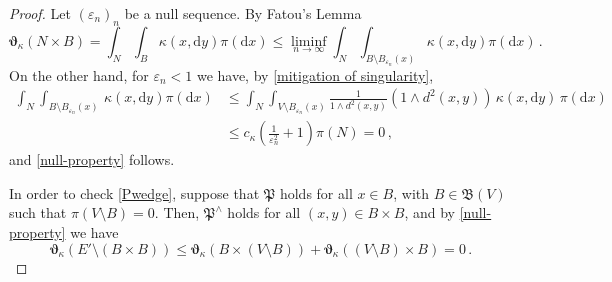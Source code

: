 \documentclass[11pt,reqno]{amsart}
\numberwithin{equation}{section}
\newcommand{\eps}{\varepsilon}
\newcommand{\dd}{\mathrm{d}}
\theoremstyle{definition}
\newcommand{\ep}{\varepsilon}
\let\eps\ep
\def\dd{\mathrm{d}}
\newcommand{\teta}{\boldsymbol \vartheta}
\newcommand{\tetapi}{\boldsymbol{\teta}_{\kappa}}
\newcommand{\Ed}{{E'}}
\newcommand{\down}{\downarrow}
\newcommand{\TODOBS}[1]{\todo[inline, color=red!40]{#1}}
\newcommand{\TODO}[1]{\todo[inline, color=cyan!20]{#1}}
\newcommand{\EEE}{\color{black}}
\numberwithin{equation}{section}
\begin{document}
 \begin{proof}
Let $(\eps_n)_n$ be a null sequence. By Fatou's Lemma 
\[
\tetapi(N{\times}B) = \int_N \int_B \kappa(x,\dd y ) \pi(\dd x ) \leq \liminf_{n\to\infty} \int_{N} \int_{B{\setminus}B_{\eps_n}(x)} \kappa(x,\dd y )  \pi (\dd x )\,.
\]
On the other hand, for $\eps_n<1$ we have, by  \eqref{mitigation of singularity}, 
\[
\begin{aligned}
\int_{N} \int_{B{\setminus}B_{\eps_n}(x)}\, \kappa(x,\dd y )  \pi (\dd x )  & \leq \int_{N} \int_{V{\setminus}B_{\eps_n}(x)} \frac1{1{\wedge}  d^2(x,y)}
  (1{\wedge} d^2(x,y)) \,\kappa(x,\dd y)\,   \pi (\dd x ) 
 \\ &  \leq c_\kappa \left(\frac1{\eps_n^2} {+} 1\right) \pi (N) =0\,,
 \end{aligned}
\]
and \eqref{null-property} follows. 
\par
In order to check \eqref{Pwedge}, suppose that $\mathfrak{P}$ holds for all $x\in B$, with   $B\in \mathfrak{B}(V)$ such that  $\pi(V{\setminus}B)=0$.
Then, $\mathfrak{P}^{\wedge}$ holds for all $(x,y)\in B\times B$, and by \eqref{null-property} we have 
\[
\tetapi (\Ed {\setminus} (B{\times}B
)) \leq \tetapi (B{\times}(V{\setminus}B)) + \tetapi ((V{\setminus}B){\times}B) =0\,. %
\]
 \end{proof}
 \EEE
% 
\end{document}

